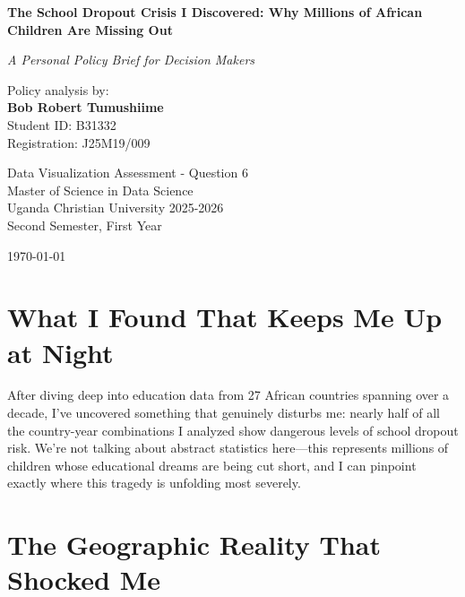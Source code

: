 \documentclass[12pt,a4paper]{article}
\begin{document}
\begin{titlepage}
\centering
\vspace*{2cm}

{\LARGE\bfseries The School Dropout Crisis I Discovered: Why Millions of African Children Are Missing Out}

\vspace{1cm}

{\large\textit{A Personal Policy Brief for Decision Makers}}

\vspace{2cm}

{\large Policy analysis by:}\\
\vspace{0.5cm}
{\Large\bfseries Bob Robert Tumushiime}\\
\vspace{0.5cm}
{\large Student ID: B31332}\\
{\large Registration: J25M19/009}

\vspace{3cm}

{\large Data Visualization Assessment - Question 6}\\
{\large Master of Science in Data Science}\\
{\large Uganda Christian University 2025-2026}\\
{\large Second Semester, First Year}

\vspace{2cm}

{\large \today}

\end{titlepage}

\newpage
\tableofcontents
\newpage

\section{What I Found That Keeps Me Up at Night}

After diving deep into education data from 27 African countries spanning over a decade, I've uncovered something that genuinely disturbs me: nearly half of all the country-year combinations I analyzed show dangerous levels of school dropout risk. We're not talking about abstract statistics here---this represents millions of children whose educational dreams are being cut short, and I can pinpoint exactly where this tragedy is unfolding most severely.

\section{The Geographic Reality That Shocked Me}
\end{document}
